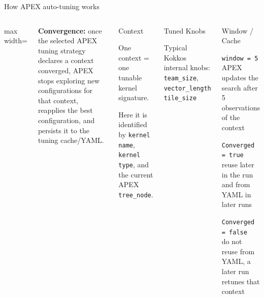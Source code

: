 \documentclass[11pt]{beamer}
\begin{document}
\begin{frame}[t]{How APEX auto-tuning works}
\begin{columns}[T,onlytextwidth]
\begin{adjustbox}{max width=\linewidth}
\end{adjustbox}

\vspace{0.05em}
{\tiny\color{black!75}\textbf{Convergence:} once the selected APEX tuning strategy declares a context converged, APEX stops exploring new configurations for that context, reapplies the best configuration, and persists it to the tuning cache/YAML.}

\begin{beamerboxesrounded}[upper=tuner title,lower=tuner body,width=\linewidth,shadow=false]{Context}
\tiny
\raggedright
One context = one tunable kernel signature.

\vspace{0.08em}
Here it is identified by \texttt{kernel name}, \texttt{kernel type}, and the current APEX \texttt{tree\_node}.
\end{beamerboxesrounded}

\vspace{0.28em}
\begin{beamerboxesrounded}[upper=profiler title,lower=profiler body,width=\linewidth,shadow=false]{Tuned Knobs}
\tiny
\raggedright
Typical Kokkos internal knobs:\\
\texttt{team\_size}, \texttt{vector\_length}\\
\texttt{tile\_size}
\end{beamerboxesrounded}

\vspace{0.18em}
\begin{beamerboxesrounded}[upper=terminal title,lower=terminal body,width=\linewidth,shadow=false]{Window / Cache}
\tiny
\raggedright
\texttt{window = 5}\\
APEX updates the search after 5 observations of the context

\vspace{0.05em}
\texttt{Converged = true}\\
reuse later in the run and from YAML in later runs

\vspace{0.05em}
\texttt{Converged = false}\\
do not reuse from YAML, a later run retunes that context
\end{beamerboxesrounded}
\end{columns}
\end{frame}
\end{document}
